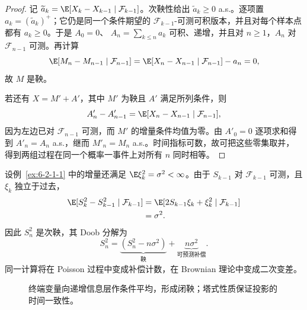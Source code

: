 \begin{proof}
记
$\widetilde a_k=\E[X_k-X_{k-1}\mid\mathcal F_{k-1}]$。次鞅性给出
$\widetilde a_k\ge0$ a.s.。逐项置 $a_k=(\widetilde a_k)^+$；它仍是同一个条件期望的
$\mathcal F_{k-1}$-可测可积版本，并且对每个样本点都有 $a_k\ge0$。于是 $A_0=0$、
$A_n=\sum_{k\le n}a_k$ 可积、递增，并且对 $n\ge1$，$A_n$ 对
$\mathcal F_{n-1}$ 可测。再计算
\[
 \E[M_n-M_{n-1}\mid\mathcal F_{n-1}]
 =\E[X_n-X_{n-1}\mid\mathcal F_{n-1}]-a_n=0,
\]
故 $M$ 是鞅。

若还有 $X=M'+A'$，其中 $M'$ 为鞅且 $A'$ 满足所列条件，则
\[
 A'_n-A'_{n-1}
 =\E[X_n-X_{n-1}\mid\mathcal F_{n-1}],
\]
因为左边已对 $\mathcal F_{n-1}$ 可测，而 $M'$ 的增量条件均值为零。由 $A'_0=0$
逐项求和得到 $A'_n=A_n$ a.s.，继而 $M'_n=M_n$ a.s.。时间指标可数，故可把这些零集取并，
得到两组过程在同一个概率一事件上对所有 $n$ 同时相等。
\end{proof}

\begin{example}[平方随机游走的补偿]
设例~\ref{ex:6-2-1-1} 中的增量还满足
$\E\xi_k^2=\sigma^2<\infty$。由于 $S_{k-1}$ 对 $\mathcal F_{k-1}$ 可测，且
$\xi_k$ 独立于过去，
\begin{align*}
 \E[S_k^2-S_{k-1}^2\mid\mathcal F_{k-1}]
 &=\E[2S_{k-1}\xi_k+\xi_k^2\mid\mathcal F_{k-1}]\\
 &=\sigma^2.
\end{align*}
因此 $S_n^2$ 是次鞅，其 Doob 分解为
\[
 S_n^2=\underbrace{(S_n^2-n\sigma^2)}_{\text{鞅}}
       +\underbrace{n\sigma^2}_{\text{可预测补偿}}.
\]
同一计算将在 Poisson 过程中变成补偿计数，在 Brownian 理论中变成二次变差。
\end{example}

\begin{figure}[htbp]
\centering
{}
\caption{终端变量向递增信息层作条件平均，形成闭鞅；塔式性质保证投影的时间一致性。}
\label{fig:6-2-1-filtration}
\end{figure}

